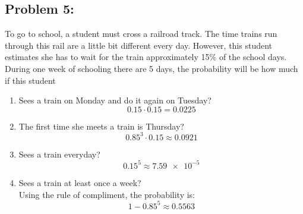 \documentclass[a4paper]{article}
\begin{document}
\subsection*{Problem 5:}
To go to school, a student must cross a railroad track. The time trains run through this rail are a little bit different every day. However, this student estimates she has to wait for the train approximately 15\% of the school days. During one week of schooling there are 5 days, the probability will be how much if this student
\begin{enumerate}
	\item Sees a train on Monday and do it again on Tuesday?
	      \begin{equation*}
		      0.15 \cdot 0.15 = 0.0225
	      \end{equation*}
	\item The first time she meets a train is Thursday?
	      \begin{equation*}
		      0.85^3 \cdot 0.15 \approx 0.0921
	      \end{equation*}
	\item Sees a train everyday?
	      \begin{equation*}
		      0.15^5 \approx \num{7.59e-5}
	      \end{equation*}
	\item Sees a train at least once a week? \\
	      Using the rule of compliment, the probability is: 
	      \begin{equation*}
		      1 - 0.85^5 \approx 0.5563
	      \end{equation*}
\end{enumerate}

\end{document}
